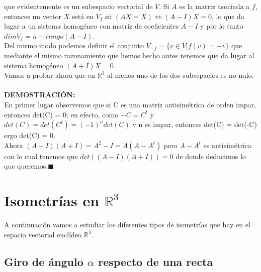 \documentclass[10pt,a4paper]{article}
\theoremstyle{mystyle}
\newtheorem{prop}{\textcolor{green}{\textbf{Proposición}}}
\begin{document}
que evidentemente es un subespacio vectorial de $V$. Si $A$ es la matriz asociada a $f$, entonces un vector $X$ está en $V_f$ sii $(AX = X) \Longleftrightarrow (A-I)X = 0$, lo que da lugar a un sistema homogéneo con matriz de coeficientes $A-I$ y por lo tanto $dim V_f = n - rango(A-I)$.\\

Del mismo modo podemos definir el conjunto $V_{-f} = \lbrace v \in V \vert f(v) = -v \rbrace$  que mediante el mismo razonamiento que hemos hecho antes tenemos que da lugar al sistema homogéneo $(A+I)X = 0$.\\

Vamos a probar ahora que en $\mathbb{R}^3$ al menos uno de los dos subespacios es no nulo.\\

\hfill \\

\textbf{DEMOSTRACIÓN:}\\

En primer lugar observemos que si C es una matriz antisimétrica de orden impar, entonces det(C) = 0; en efecto, como $-C = C^t$ y $det(C) = det(C^t) = (-1)^ndet(C)$ y n es impar, entonces det(C) = det(-C) ergo det(C) = 0.\\

Ahora $(A-I)(A+I) = A^2 - I = A(A - A^t)$ pero $A-A^t$ es antisimétrica con lo cual tenemos que $det((A-I)(A+I)) = 0$ de donde deducimos lo que queremos.$\blacksquare$\\

\section{Isometrías en $\mathbb{R}^3$}

A continuación vamos a estudiar los diferentes tipos de isometrías que hay en el espacio vectorial euclídeo $\mathbb{R}^3$.\\

\subsection{Giro de ángulo $\alpha$ respecto de una recta}
\end{document}
